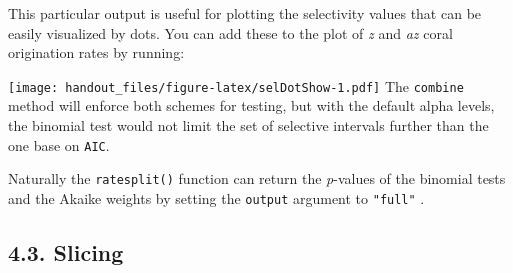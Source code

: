 \documentclass[]{article}
\newenvironment{Shaded}{\begin{snugshade}}{\end{snugshade}}
\newcommand{\CommentTok}[1]{\textcolor[rgb]{0.56,0.35,0.01}{\textit{#1}}}
\newcommand{\ControlFlowTok}[1]{\textcolor[rgb]{0.13,0.29,0.53}{\textbf{#1}}}
\newcommand{\DataTypeTok}[1]{\textcolor[rgb]{0.13,0.29,0.53}{#1}}
\newcommand{\DecValTok}[1]{\textcolor[rgb]{0.00,0.00,0.81}{#1}}
\newcommand{\KeywordTok}[1]{\textcolor[rgb]{0.13,0.29,0.53}{\textbf{#1}}}
\newcommand{\NormalTok}[1]{#1}
\newcommand{\OperatorTok}[1]{\textcolor[rgb]{0.81,0.36,0.00}{\textbf{#1}}}
\newcommand{\StringTok}[1]{\textcolor[rgb]{0.31,0.60,0.02}{#1}}
\begin{document}
This particular output is useful for plotting the selectivity values
that can be easily visualized by dots. You can add these to the plot of
\emph{z} and \emph{az} coral origination rates by running:

\begin{Shaded}
\end{Shaded}

\texttt{[image: handout\_files/figure-latex/selDotShow-1.pdf]} The
\texttt{combine} method will enforce both schemes for testing, but with
the default alpha levels, the binomial test would not limit the set of
selective intervals further than the one base on \texttt{AIC}.

Naturally the \texttt{ratesplit()} function can return the
\emph{p}-values of the binomial tests and the Akaike weights by setting
the \texttt{output} argument to \texttt{"full"} .

\hypertarget{slicing}{%
\subsection{4.3. Slicing}\label{slicing}}
\end{document}
